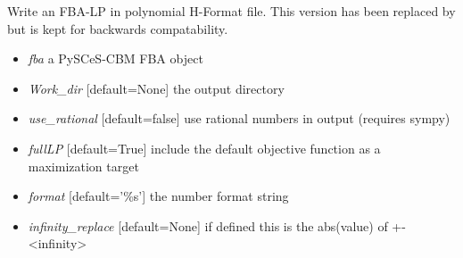 \documentclass[a4paper,11pt,english]{sphinxmanual}
\begin{document}
\begin{fulllineitems}
\label{modules_doc:cbmpy.CBWrite.writeModelHFormatFBA}
Write an FBA-LP in polynomial H-Format file. This version has been replaced by 
but is kept for backwards compatability.
\begin{itemize}
\item {} 
\emph{fba} a PySCeS-CBM FBA object

\item {} 
\emph{Work\_dir} {[}default=None{]} the output directory

\item {} 
\emph{use\_rational} {[}default=false{]} use rational numbers in output (requires sympy)

\item {} 
\emph{fullLP} {[}default=True{]} include the default objective function as a maximization target

\item {} 
\emph{format} {[}default='\%s'{]} the number format string

\item {} 
\emph{infinity\_replace} {[}default=None{]} if defined this is the abs(value) of +-\textless{}infinity\textgreater{}

\end{itemize}

\end{fulllineitems}

\end{document}
